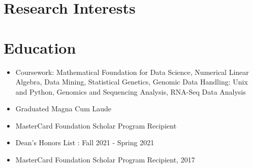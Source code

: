 \documentclass[12pt,a4paper,sans]{moderncv} %
\begin{document}
\makecvtitle %
\vspace*{-1.5cm}

\section{Research Interests}



\section{Education}
\begin{itemize}
    \item Coursework: Mathematical Foundation for Data Science, Numerical Linear Algebra, Data Mining, Statistical Genetics, Genomic Data Handling: Unix and Python, Genomics and Sequencing Analysis, RNA-Seq Data Analysis
\end{itemize}
\begin{itemize}
    \item Graduated Magna Cum Laude
    \item MasterCard Foundation Scholar Program Recipient
    \item Dean's Honors List : Fall 2021 - Spring 2021
    \item MasterCard Foundation Scholar Program Recipient, 2017
\end{itemize}

\end{document}
